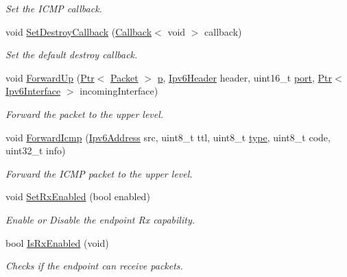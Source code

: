 \begin{DoxyCompactItemize}
\begin{DoxyCompactList}\small\item\em Set the I\+C\+MP callback. \end{DoxyCompactList}\item 
void \hyperlink{classns3_1_1Ipv6EndPoint_af2922ef8f9f9ead0a2604c8391e90328}{Set\+Destroy\+Callback} (\hyperlink{classns3_1_1Callback}{Callback}$<$ void $>$ callback)
\begin{DoxyCompactList}\small\item\em Set the default destroy callback. \end{DoxyCompactList}\item 
void \hyperlink{classns3_1_1Ipv6EndPoint_a2564bcfd9737135c8f21c2e4db5157d0}{Forward\+Up} (\hyperlink{classns3_1_1Ptr}{Ptr}$<$ \hyperlink{classns3_1_1Packet}{Packet} $>$ \hyperlink{lte__link__budget__x2__handover__measures_8m_ac9de518908a968428863f829398a4e62}{p}, \hyperlink{classns3_1_1Ipv6Header}{Ipv6\+Header} header, uint16\+\_\+t \hyperlink{visualizer-ideas_8txt_a21ff1c530daf8435e00048b7fc2c58e3}{port}, \hyperlink{classns3_1_1Ptr}{Ptr}$<$ \hyperlink{classns3_1_1Ipv6Interface}{Ipv6\+Interface} $>$ incoming\+Interface)
\begin{DoxyCompactList}\small\item\em Forward the packet to the upper level. \end{DoxyCompactList}\item 
void \hyperlink{classns3_1_1Ipv6EndPoint_ac5995f5c6c1f15fc8ef7d8daf76167ad}{Forward\+Icmp} (\hyperlink{classns3_1_1Ipv6Address}{Ipv6\+Address} src, uint8\+\_\+t ttl, uint8\+\_\+t \hyperlink{visualizer-ideas_8txt_add98db9e15e2a58cf2b57623e7aa893a}{type}, uint8\+\_\+t code, uint32\+\_\+t info)
\begin{DoxyCompactList}\small\item\em Forward the I\+C\+MP packet to the upper level. \end{DoxyCompactList}\item 
void \hyperlink{classns3_1_1Ipv6EndPoint_ab580b3c4f007524be5178d5758ccea67}{Set\+Rx\+Enabled} (bool enabled)
\begin{DoxyCompactList}\small\item\em Enable or Disable the endpoint Rx capability. \end{DoxyCompactList}\item 
bool \hyperlink{classns3_1_1Ipv6EndPoint_a60559306871f48ebffb5b84436cda5cc}{Is\+Rx\+Enabled} (void)
\begin{DoxyCompactList}\small\item\em Checks if the endpoint can receive packets. \end{DoxyCompactList}\end{DoxyCompactItemize}
